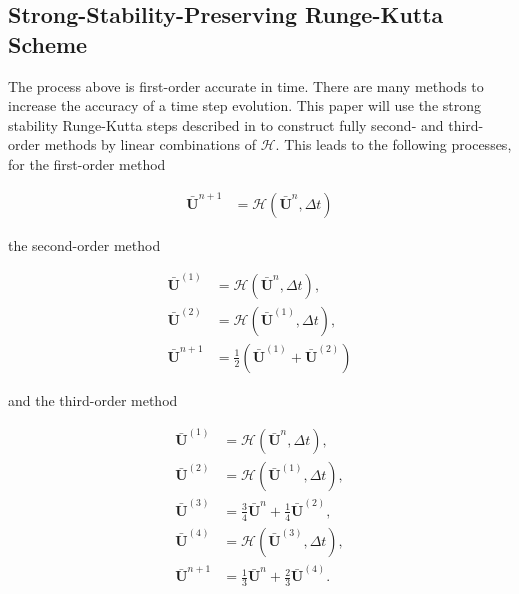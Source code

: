 \documentclass[SingleSpace,12pt,Proceedings]{Serre_ASCE}
\begin{document}
\subsection{Strong-Stability-Preserving Runge-Kutta Scheme} %
The process above is first-order accurate in time. There are many methods to increase the accuracy of a time step evolution. This paper will use the strong stability Runge-Kutta steps described in  to construct fully second- and third-order methods by linear combinations of $\mathcal{H}$. This leads to the following processes, for the first-order method
\begin{linenomath*}
\begin{align*}
\boldsymbol{\bar{U}}^{n+1} &= \mathcal{H}\left(\boldsymbol{\bar{U}}^{n},\Delta t\right)
\end{align*}
\end{linenomath*}
the second-order method
\begin{linenomath*}
\begin{align*}
\boldsymbol{\bar{U}}^{\left(1\right)} &= \mathcal{H}\left(\boldsymbol{\bar{U}}^{n},\Delta t\right), \\
\boldsymbol{\bar{U}}^{\left(2\right)} &= \mathcal{H}\left(\boldsymbol{\bar{U}}^{\left(1\right)},\Delta t\right), \\
\boldsymbol{\bar{U}}^{n+1} &=\frac{1}{2}\left(\boldsymbol{\bar{U}}^{\left(1\right)} + \boldsymbol{\bar{U}}^{\left(2\right)}  \right)
\end{align*}
\end{linenomath*}
and the third-order method
\begin{linenomath*}
\begin{align*}
\boldsymbol{\bar{U}}^{\left(1\right)} &= \mathcal{H}\left(\boldsymbol{\bar{U}}^{n},\Delta t\right), \\
\boldsymbol{\bar{U}}^{\left(2\right)} &= \mathcal{H}\left(\boldsymbol{\bar{U}}^{\left(1\right)},\Delta t\right), \\
\boldsymbol{\bar{U}}^{\left(3\right)} &= \frac{3}{4}\boldsymbol{\bar{U}}^{n} + \frac{1}{4}\boldsymbol{\bar{U}}^{\left(2\right)} , \\
\boldsymbol{\bar{U}}^{\left(4\right)} &= \mathcal{H}\left(\boldsymbol{\bar{U}}^{\left(3\right)},\Delta t\right), \\
\boldsymbol{\bar{U}}^{n+1} &= \frac{1}{3}\boldsymbol{\bar{U}}^{n} + \frac{2}{3}\boldsymbol{\bar{U}}^{\left(4\right)}.
\end{align*}
\end{linenomath*}
\end{document}
